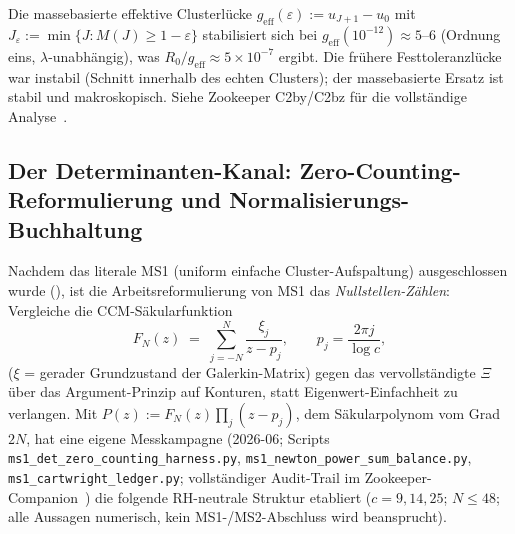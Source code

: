 \documentclass[12pt,a4paper]{article}
\theoremstyle{definition}
\theoremstyle{remark}
\begin{document}
Die massebasierte effektive Clusterlücke
$g_{\text{eff}}(\varepsilon) := u_{J+1}-u_0$ mit
$J_\varepsilon := \min\{J: M(J)\ge 1-\varepsilon\}$ stabilisiert sich
bei $g_{\text{eff}}(10^{-12}) \approx 5\text{--}6$ (Ordnung eins,
$\lambda$-unabhängig), was
$R_0/g_{\text{eff}}\approx 5\times 10^{-7}$ ergibt. Die frühere
Festtoleranzlücke war instabil (Schnitt innerhalb des echten Clusters);
der massebasierte Ersatz ist stabil und makroskopisch. Siehe Zookeeper
C2by/C2bz für die vollständige Analyse~\cite{Geiger2026zookeeper}.


\subsection{Der Determinanten-Kanal: Zero-Counting-Reformulierung und
Normalisierungs-Buchhaltung}
\label{sec:det-channel}

Nachdem das literale MS1 (uniform einfache Cluster-Aufspaltung)
ausgeschlossen wurde (), ist die
Arbeitsreformulierung von MS1 das \emph{Nullstellen-Zählen}: Vergleiche
die CCM-Säkularfunktion
\[
  F_N(z) \;=\; \sum_{j=-N}^{N} \frac{\xi_j}{z-p_j},
  \qquad p_j = \frac{2\pi j}{\log c},
\]
($\xi$ = gerader Grundzustand der Galerkin-Matrix) gegen das
vervollständigte $\Xi$ über das Argument-Prinzip auf Konturen, statt
Eigenwert-Einfachheit zu verlangen. Mit
$P(z) := F_N(z)\prod_{j}(z-p_j)$, dem Säkularpolynom vom Grad $2N$,
hat eine eigene Messkampagne (2026-06; Scripts
\texttt{ms1\_det\_zero\_counting\_harness.py},
\texttt{ms1\_newton\_power\_sum\_balance.py},
\texttt{ms1\_cartwright\_ledger.py}; vollständiger Audit-Trail im
Zookeeper-Companion~\cite{Geiger2026zookeeper}) die folgende RH-neutrale
Struktur etabliert ($c = 9, 14, 25$; $N \le 48$; alle Aussagen
numerisch, kein MS1-/MS2-Abschluss wird beansprucht).
\end{document}
